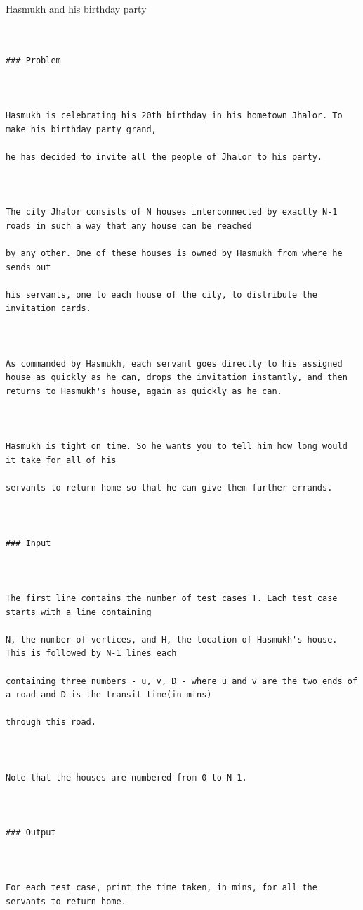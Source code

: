 \documentclass{article}
\begin{document}
{\large Hasmukh and his birthday party  } \\[0.5in]
\begin{flushleft}
\begin{lstlisting}
    

### Problem



Hasmukh is celebrating his 20th birthday in his hometown Jhalor. To make his birthday party grand,

he has decided to invite all the people of Jhalor to his party.



The city Jhalor consists of N houses interconnected by exactly N-1 roads in such a way that any house can be reached

by any other. One of these houses is owned by Hasmukh from where he sends out

his servants, one to each house of the city, to distribute the invitation cards. 



As commanded by Hasmukh, each servant goes directly to his assigned house as quickly as he can, drops the invitation instantly, and then returns to Hasmukh's house, again as quickly as he can.



Hasmukh is tight on time. So he wants you to tell him how long would it take for all of his

servants to return home so that he can give them further errands.



### Input



The first line contains the number of test cases T. Each test case starts with a line containing

N, the number of vertices, and H, the location of Hasmukh's house. This is followed by N-1 lines each 

containing three numbers - u, v, D - where u and v are the two ends of a road and D is the transit time(in mins)

through this road.



Note that the houses are numbered from 0 to N-1.



### Output



For each test case, print the time taken, in mins, for all the servants to return home.




\end{lstlisting}
\end{flushleft}
\end{document}
